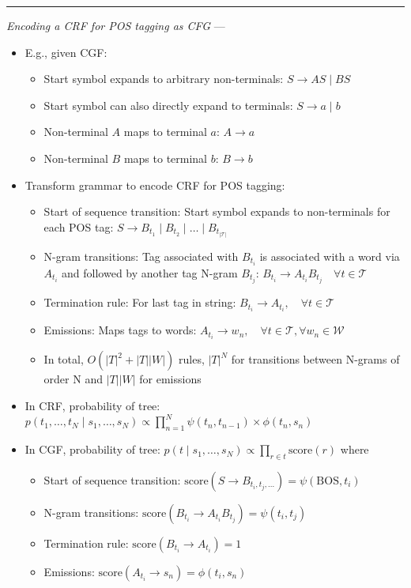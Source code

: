 {\color{lightgray}\hrule height 0.001mm}

\emph{Encoding a CRF for POS tagging as CFG} ---
\begin{itemize}
    \item E.g., given CGF:
    \begin{itemize}
        \item Start symbol expands to arbitrary non-terminals: $S \to AS \mid BS$
        \item Start symbol can also directly expand to terminals: $S \to a \mid b$
        \item Non-terminal $A$ maps to terminal $a$: $A \to a$
        \item Non-terminal $B$ maps to terminal $b$: $B \to b$
    \end{itemize}
    \item Transform grammar to encode CRF for POS tagging:
    \begin{itemize}
        \item Start of sequence transition: Start symbol expands to non-terminals for each POS tag: $S \to B_{t_1} \mid B_{t_2} \mid \dots \mid B_{ t_{|\mathcal{T}|}}$
        \item N-gram transitions: Tag associated with $B_{t_i}$ is associated with a word via $A_{t_i}$ and followed by another tag N-gram $B_{t_j}$: $B_{t_i} \to A_{t_i} B_{t_j} \quad \forall t \in \mathcal{T}$
        \item Termination rule: For last tag in string: $B_{t_i} \to A_{t_i}, \quad \forall t \in \mathcal{T}$
        \item Emissions: Maps tags to words: $A_{t_i} \to w_n, \quad \forall t \in \mathcal{T}, \forall w_n \in \mathcal{W}$
        \item In total, $O(|T|^2 + |T||W|)$ rules, $|T|^N$ for transitions between N-grams of order N and $|T||W|$ for emissions
    \end{itemize}
    \item In CRF, probability of tree: $
    p(t_1, \dots, t_N \mid s_1, \dots, s_N) \propto \prod_{n=1}^{N} \psi(t_n, t_{n-1}) \times \phi(t_n, s_n)
    $
    \item In CGF, probability of tree: $
    p(t \mid s_1, \dots, s_N) \propto \prod_{r \in t} \text{score}(r)
    $ where
    \begin{itemize}
        \item Start of sequence transition:
        $
        \text{score}(S \to B_{t_i, t_j, ...}) = \psi(\text{BOS}, t_i)
        $
        \item N-gram transitions:
        $
        \text{score}(B_{t_i} \to A_{t_i} B_{t_j}) = \psi(t_i, t_j)
        $
        \item Termination rule: 
        $
        \text{score}(B_{t_i} \to A_{t_i}) = 1
        $
        \item Emissions: 
        $
        \text{score}(A_{t_i} \to s_n) = \phi(t_i, s_n)
        $
    \end{itemize}
\end{itemize}

